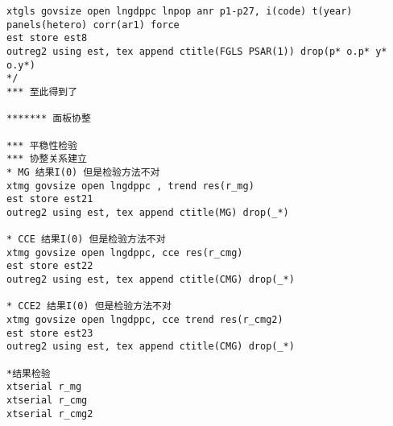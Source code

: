 \begin{lstlisting}[frame=single]
xtgls govsize open lngdppc lnpop anr p1-p27, i(code) t(year) panels(hetero) corr(ar1) force
est store est8
outreg2 using est, tex append ctitle(FGLS PSAR(1)) drop(p* o.p* y* o.y*)
*/
*** 至此得到了 

******* 面板协整

*** 平稳性检验
*** 协整关系建立
* MG 结果I(0) 但是检验方法不对
xtmg govsize open lngdppc , trend res(r_mg)   
est store est21
outreg2 using est, tex append ctitle(MG) drop(_*)

* CCE 结果I(0) 但是检验方法不对
xtmg govsize open lngdppc, cce res(r_cmg) 
est store est22
outreg2 using est, tex append ctitle(CMG) drop(_*)

* CCE2 结果I(0) 但是检验方法不对
xtmg govsize open lngdppc, cce trend res(r_cmg2)
est store est23
outreg2 using est, tex append ctitle(CMG) drop(_*)

*结果检验
xtserial r_mg
xtserial r_cmg
xtserial r_cmg2
\end{lstlisting}

